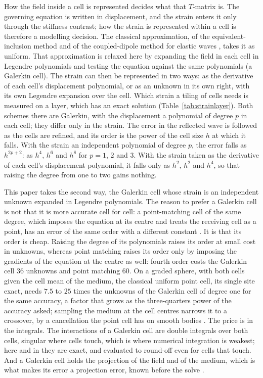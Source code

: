 \documentclass[11pt,a4paper]{article}
\begin{document}
How the field inside a cell is represented decides what that $T$-matrix is. The governing equation is
written in displacement, and the strain enters it only through the stiffness contrast; how the strain is
represented within a cell is therefore a modelling decision. The classical approximation, of the
equivalent-inclusion method \citep{Eshelby1957,Mura1987} and of the coupled-dipole method for elastic
waves \citep{Nestor1996}, takes it as uniform. That approximation is relaxed here by expanding the field in
each cell in Legendre polynomials and testing the equation against the same polynomials (a Galerkin cell).
The strain can then be represented in two ways: as the derivative of each cell's displacement polynomial,
or as an unknown in its own right, with its own Legendre expansion over the cell. Which strain a tiling of
cells needs is measured on a layer, which has an exact
solution (Table~\ref{tab:strainlayer}). Both schemes there are Galerkin, with the displacement a polynomial
of degree $p$ in each cell; they differ only in the strain. The error in the reflected wave is followed as
the cells are refined, and its order is the power of the cell size $h$ at which it falls. With the strain
an independent polynomial of degree $p$, the error falls as $h^{2p+2}$: as $h^4$, $h^6$ and $h^8$ for
$p=1$, $2$ and $3$. With the strain taken as the derivative of each cell's displacement polynomial, it falls
only as $h^2$, $h^2$ and $h^4$, so that raising the degree from one to two gains nothing.

This paper takes the second way, the Galerkin cell whose strain is an independent unknown expanded in
Legendre polynomials. The reason to prefer a Galerkin cell is not that it is more accurate cell for cell: a
point-matching cell of the same degree, which imposes the equation at its centre and treats the receiving
cell as a point, has an error of the same order with a different constant \citep{NestorError2026}. It is
that its order is cheap. Raising the degree of its polynomials raises its order at small cost in unknowns,
whereas point matching raises its order only by imposing the gradients of the equation at the centre as
well: fourth order costs the Galerkin cell $36$ unknowns and point matching $60$. On a graded sphere, with
both cells given the cell mean of the medium, the classical uniform point cell, its single site exact,
needs $7.5$ to $25$ times the unknowns of the Galerkin cell of degree one for the same accuracy, a factor
that grows as the three-quarters power of the accuracy asked; sampling the medium at the cell centres
narrows it to a crossover, by a cancellation the point cell has on smooth bodies
\citep{NestorError2026}. The price is in the integrals. The interactions of a Galerkin
cell are double integrals over both cells, singular where cells touch, which is where numerical integration
is weakest; here and in \citet{NestorCoupling2026} they are exact, and evaluated to round-off even for cells
that touch. And a Galerkin cell holds the
projection of the field and of the medium, which is what makes its error a projection error, known before
the solve \citep{NestorError2026}.
\end{document}
